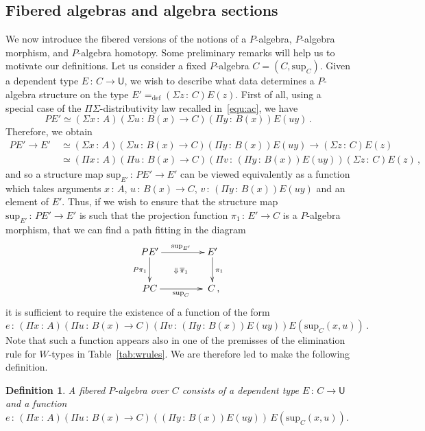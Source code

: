 \documentclass[10pt,a4paper,oneside,reqno]{amsart}
\numberwithin{equation}{section}
\theoremstyle{mythm}
\theoremstyle{mydef}
\newtheorem{definition}[theorem]{Definition}
\theoremstyle{myrmk}
\newcommand{\ie}{\text{i.e.\ }}
\newcommand{\defeq}{=_{\mathrm{def}}}
\newcommand{\co}{\,{:}\,}
\newcommand{\U}{\mathsf{U}}
\renewcommand{\sup}{\mathrm{sup}}
\begin{document}
\subsection*{Fibered algebras and algebra sections} We now introduce the fibered versions of the notions of a $P$-algebra, $P$-algebra morphism, and $P$-algebra homotopy. Some preliminary remarks will help us to motivate our definitions. Let us consider a fixed $P$-algebra   $C = (C, \sup_C)$.
Given a dependent type $E \co C \to \U$,
we wish to describe what data determines a $P$-algebra structure on the type $E' \defeq (\Sigma z \co C) E(z)$. First of all, using a special case of the $\Pi\Sigma$-distributivity law recalled in~\eqref{equ:ac}, we have 
\[
PE' \simeq (\Sigma x \co A) (\Sigma u \co B(x) \to C) (\Pi y \co B(x)) E (uy) \, .
\]
Therefore, we obtain
\begin{align*} 
PE' \to E' \ & \simeq 
 (\Sigma x \co A) (\Sigma u \co B(x) \to C) (\Pi y \co B(x)) E (uy)  \to (\Sigma z \co C) E(z) \\ 
 & \simeq (\Pi x \co A)(\Pi u \co B(x) \to C) (\Pi v \co (\Pi y \co B(x)) E(uy)) (\Sigma z \co C) E(z) \, , 
\end{align*}
and so a structure map $\sup_{E'} \co PE' \to E'$ can be viewed equivalently as a function which 
takes arguments $x \co A$, $u \co B(x) \to C$, $v \co (\Pi y \co B(x))E(uy)$ and an element of $E'$.
Thus, if we wish to ensure that the structure map $\sup_{E'} \co PE' \to E'$ is such that the projection function
 $\pi_1 \co E' \to C$ is a $P$-algebra morphism,  \ie that we can find a path fitting in the diagram
 \[
 \xymatrix@C=1.5cm{
 PE' \ar[d]_-{P \pi_1} \ar[r]^{\sup_{E'}} \ar@{}[dr]|{\Downarrow \,  \overline{\pi}_1} & E' \ar[d]^{\pi_1} \\
 PC \ar[r]_{\sup_C} & \; C \, ,}
 \]
it is sufficient to require the existence of a function of the form
\[
e \co (\Pi x \co A)(\Pi u \co B(x) \to C) (\Pi v \co (\Pi y \co B(x)) E(uy))  E(\sup_C(x,u)) \, . 
 \]  
Note that such a function appears also in one of the premisses of the elimination rule for $W$-types in Table~\ref{tab:wrules}.  We are therefore led to make the following definition. 

\begin{definition} \label{def:fibalg}
A \emph{fibered $P$-algebra} over $C$ consists of a dependent type $E \co C \to \U$
and a function  $e \co  (\Pi x \co A) (\Pi u \co B(x) \to C)   ((\Pi y \co B(x))   E(u y))  \,  E(\sup_C(x,u))$.
\end{definition}
\end{document}
